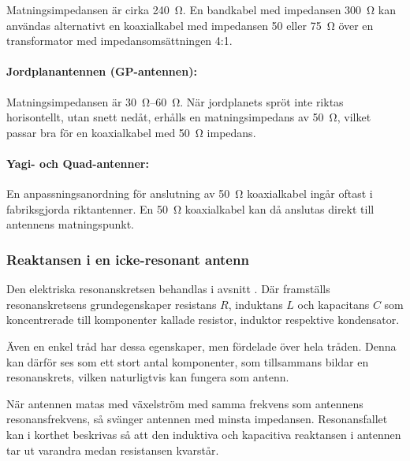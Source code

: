 Matningsimpedansen är cirka \SI{240}{\ohm}.
En bandkabel med impedansen \SI{300}{\ohm} kan användas alternativt en
koaxialkabel med impedansen 50 eller \SI{75}{\ohm} över en transformator med
impedansomsättningen 4:1.

\paragraph{Jordplanantennen (GP-antennen):}

Matningsimpedansen är \SIrange{30}{60}{\ohm}.
När jordplanets spröt inte riktas horisontellt, utan snett nedåt, erhålls en
matningsimpedans av \SI{50}{\ohm}, vilket passar bra för en koaxialkabel med
\SI{50}{\ohm} impedans.

\paragraph{Yagi- och Quad-antenner:}

En anpassningsanordning för anslutning av \SI{50}{\ohm} koaxialkabel ingår
oftast i fabriksgjorda riktantenner.
En \SI{50}{\ohm} koaxialkabel kan då anslutas direkt till antennens
matningspunkt.

\subsubsection{Reaktansen i en icke-resonant antenn}

Den elektriska resonanskretsen behandlas i avsnitt .
Där framställs resonanskretsens grundegenskaper resistans \(R\),
induktans \(L\) och kapacitans \(C\) som koncentrerade till komponenter kallade
resistor, induktor respektive kondensator.

Även en enkel tråd har dessa egenskaper, men fördelade över hela tråden.
Denna kan därför ses som ett stort antal komponenter, som tillsammans bildar en
resonanskrets, vilken naturligtvis kan fungera som antenn.

När antennen matas med växelström med samma frekvens som antennens
resonansfrekvens, så svänger antennen med minsta impedansen.
Resonansfallet kan i korthet beskrivas så att den induktiva och kapacitiva
reaktansen i antennen tar ut varandra medan resistansen kvarstår.

